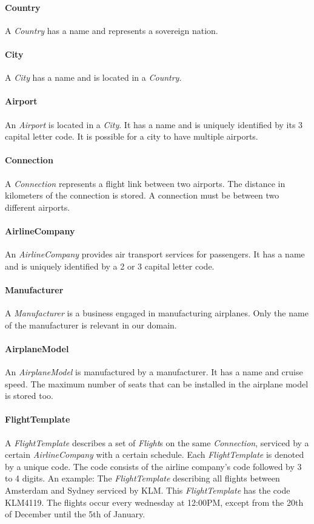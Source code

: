 \documentclass[a4paper]{article}
\newcommand{\field}[1]{\emph{#1}}
\begin{document}
\paragraph{Country}
A \field{Country} has a name and represents a sovereign nation.
\paragraph{City}
A \field{City} has a name and is located in a \field{Country}.
\paragraph{Airport}
An \field{Airport} is located in a \field{City}.
It has a name and is uniquely identified by its 3 capital letter code.
It is possible for a city to have multiple airports.
\paragraph{Connection}
A \field{Connection} represents a flight link between two airports.
The distance in kilometers of the connection is stored.
A connection must be between two different airports.
\paragraph{AirlineCompany}
An \field{AirlineCompany} provides air transport services for passengers.
It has a name and is uniquely identified by a 2 or 3 capital letter code.
\paragraph{Manufacturer}
A \field{Manufacturer} is a business engaged in manufacturing airplanes.
Only the name of the manufacturer is relevant in our domain.
\paragraph{AirplaneModel}
An \field{AirplaneModel} is manufactured by a manufacturer.
It has a name and cruise speed.
The maximum number of seats that can be installed in the airplane model is stored too.
\paragraph{FlightTemplate}\label{par: flighttemplate}
A \field{FlightTemplate} describes a set of \field{Flight}s on the same \field{Connection}, serviced by a certain \field{AirlineCompany} with a certain schedule.
Each \field{FlightTemplate} is denoted by a unique code.
The code consists of the airline company's code followed by 3 to 4 digits.
An example: The \field{FlightTemplate} describing all flights between Amsterdam and Sydney serviced by KLM. This \field{FlightTemplate} has the code KLM4119.
The flights occur every wednesday at 12:00PM, except from the 20th of December until the 5th of January. 
\end{document}
